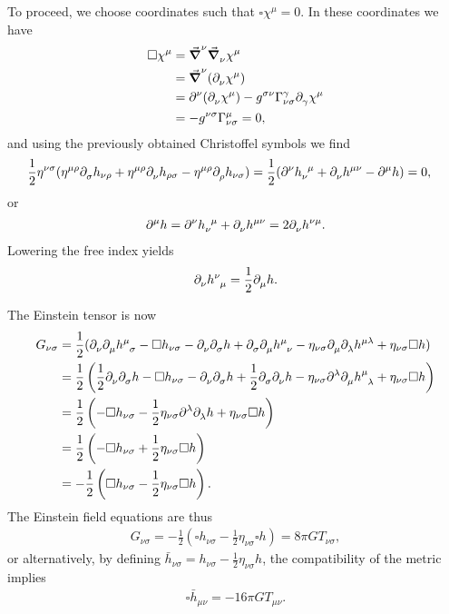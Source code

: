 To proceed, we choose coordinates such that $\square\chi^{\mu} = 0$. In these coordinates we have
\begin{align*}
	\square \chi^{\mu} &= \dcov[\nu]{}{\dcov{\nu}{\chi^{\mu}}} \\
	                   &= \dcov[\nu]{}{(\del{\nu}{\chi^{\mu}})} \\
	                   &= \del[\nu]{}{(\del{\nu}{\chi^{\mu}})} - g^{\sigma\nu}\chris{\gamma}{\nu}{\sigma}\del{\gamma}{\chi^{\mu}} \\
	                   &= -g^{\nu\sigma}\chris{\mu}{\nu}{\sigma} = 0,
\end{align*}
and using the previously obtained Christoffel symbols we find
\begin{align*}
	\frac{1}{2}\eta^{\nu\sigma}(\eta^{\mu\rho}\del{\sigma}{h_{\nu\rho}} + \eta^{\mu\rho}\del{\nu}{h_{\rho\sigma}} - \eta^{\mu\rho}\del{\rho}{h_{\nu\sigma}}) &= \frac{1}{2}(\del[\nu]{}{\tensor{h}{_{\nu}^{\mu}}} + \del{\nu}{\tensor{h}{^{\mu\nu}}} - \del[\mu]{}{h}) = 0,
\end{align*}
or
\begin{align*}
	\del[\mu]{}{h} = \del[\nu]{}{\tensor{h}{_{\nu}^{\mu}}} + \del{\nu}{\tensor{h}{^{\mu\nu}}} = 2\del{\nu}{h^{\nu\mu}}.
\end{align*}
Lowering the free index yields
\begin{align*}
	\del{\nu}{\tensor{h}{^{\nu}_{\mu}}} = \frac{1}{2}\del{\mu}{h}.
\end{align*}

The Einstein tensor is now
\begin{align*}
	G_{\nu\sigma} &= \frac{1}{2}(\del{\nu}{\del{\mu}{\tensor{h}{^{\mu}_{\sigma}}}} - \square h_{\nu\sigma} - \del{\nu}{\del{\sigma}{h}} + \del{\sigma}{\del{\mu}{\tensor{h}{^{\mu}_{\nu}}}} - \eta_{\nu\sigma}\del{\mu}{\del{\lambda}{\tensor{h}{^{\mu\lambda}}}} + \eta_{\nu\sigma}\square h) \\
	              &= \frac{1}{2}\left(\frac{1}{2}\del{\nu}{\del{\sigma}{h}} - \square h_{\nu\sigma} - \del{\nu}{\del{\sigma}{h}} + \frac{1}{2}\del{\sigma}{\del{\nu}{h}} - \eta_{\nu\sigma}\del[\lambda]{}{\del{\mu}{\tensor{h}{^{\mu}_{\lambda}}}} + \eta_{\nu\sigma}\square h\right) \\
	              &= \frac{1}{2}\left(-\square h_{\nu\sigma} - \frac{1}{2}\eta_{\nu\sigma}\del[\lambda]{}{\del{\lambda}{h}} + \eta_{\nu\sigma}\square h\right) \\
	              &= \frac{1}{2}\left(-\square h_{\nu\sigma} + \frac{1}{2}\eta_{\nu\sigma}\square h\right) \\
	              &= -\frac{1}{2}\left(\square h_{\nu\sigma} - \frac{1}{2}\eta_{\nu\sigma}\square h\right).
\end{align*}
The Einstein field equations are thus
\begin{align*}
	G_{\nu\sigma} = -\frac{1}{2}\left(\square h_{\nu\sigma} - \frac{1}{2}\eta_{\nu\sigma}\square h\right) = 8\pi GT_{\nu\sigma},
\end{align*}
or alternatively, by defining $\bar{h}_{\nu\sigma} = h_{\nu\sigma} - \frac{1}{2}\eta_{\nu\sigma}h$, the compatibility of the metric implies
\begin{align*}
	\square\bar{h}_{\mu\nu} = -16\pi GT_{\mu\nu}.
\end{align*}

